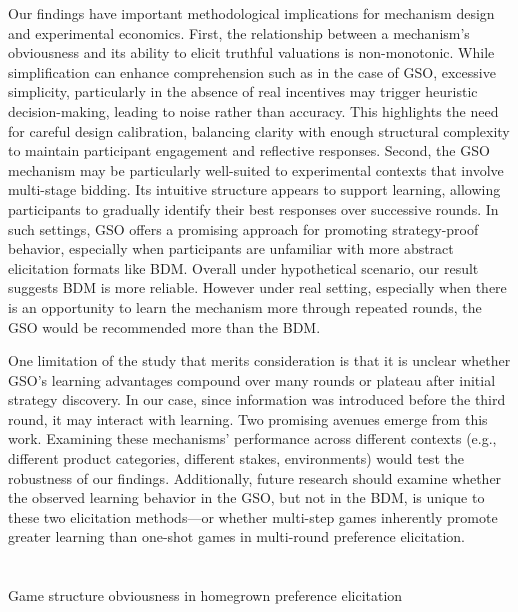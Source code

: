 \documentclass[12pt]{article}
\begin{document}
Our findings have important methodological implications for mechanism design and experimental economics. First, the relationship between a mechanism’s obviousness and its ability to elicit truthful valuations is non-monotonic. While simplification can enhance comprehension such as in the case of GSO, excessive simplicity, particularly in the absence of real incentives may trigger heuristic decision-making, leading to noise rather than accuracy. This highlights the need for careful design calibration, balancing clarity with enough structural complexity to maintain participant engagement and reflective responses. Second, the GSO mechanism may be particularly well-suited to experimental contexts that involve multi-stage bidding. Its intuitive structure appears to support learning, allowing participants to gradually identify their best responses over successive rounds. In such settings, GSO offers a promising approach for promoting strategy-proof behavior, especially when participants are unfamiliar with more abstract elicitation formats like BDM. Overall under hypothetical scenario, our result suggests BDM is more reliable. However under real setting, especially when there is an opportunity to learn the mechanism more through repeated rounds, the GSO would be recommended more than the BDM. 

One limitation of the study that merits consideration is that it is unclear whether GSO's learning advantages compound over many rounds or plateau after initial strategy discovery. In our case, since information was introduced before the third round, it may interact with learning.
Two promising avenues emerge from this work. Examining these mechanisms' performance across different contexts (e.g., different product categories, different stakes, environments) would test the robustness of our findings. Additionally, future research should examine whether the observed learning behavior in the GSO, but not in the BDM, is unique to these two elicitation methods—or whether multi-step games inherently promote greater learning than one-shot games in multi-round preference elicitation.





\newpage
	\singlespacing
	\appendix
	\setcounter{table}{0}
	\setcounter{figure}{0}
	\renewcommand{\thetable}{A\arabic{table}}
	\renewcommand{\thefigure}{A\arabic{figure}}
	\setcounter{page}{1}
	\renewcommand{\thesubsection}{\Alph{subsection}}

	\section*{}
	{\centering \LARGE Game structure obviousness in homegrown preference elicitation
		
		\vspace{0.5cm}
		\renewcommand*{\thefootnote}{\fnsymbol{footnote}}
		\setcounter{footnote}{0}
		
		\large
        }
\end{document}
